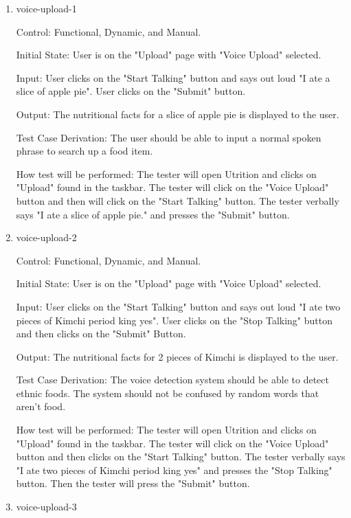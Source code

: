 \documentclass[12pt, titlepage]{article}
\begin{document}
	\begin{enumerate}
	\item{voice-upload-1\\}
	
	Control: Functional, Dynamic, and Manual.
	
	Initial State: User is on the "Upload" page with "Voice Upload" selected.
	
	Input: User clicks on the "Start Talking" button and says out loud "I ate a slice of apple pie". User clicks on the "Submit" button.
	
	Output: The nutritional facts for a slice of apple pie is displayed to the user.
	
	Test Case Derivation: The user should be able to input a normal spoken phrase to search up a food item.
	
	How test will be performed: The tester will open Utrition and clicks on "Upload" found in the taskbar. The tester will click on the "Voice Upload" button and then will click on the "Start Talking" button. The tester verbally says "I ate a slice of apple pie." and presses the "Submit" button.
	
	\item{voice-upload-2\\}
	
	Control: Functional, Dynamic, and Manual.
	
	Initial State: User is on the "Upload" page with "Voice Upload" selected.
	
	Input: User clicks on the "Start Talking" button and says out loud "I ate two pieces of Kimchi period king yes". User clicks on the "Stop Talking" button and then clicks on the "Submit" Button.
	
	Output: The nutritional facts for 2 pieces of Kimchi is displayed to the user.
	
	Test Case Derivation: The voice detection system should be able to detect ethnic foods. The system should not be confused by random words that aren't food.
	
	How test will be performed: The tester will open Utrition and clicks on "Upload" found in the taskbar. The tester will click on the "Voice Upload" button and then clicks on the "Start Talking" button. The tester verbally says "I ate two pieces of Kimchi period king yes" and presses the "Stop Talking" button. Then the tester will press the "Submit" button.
	
	\item{voice-upload-3\\}
	

\end{enumerate}
\end{document}
